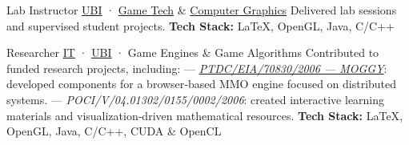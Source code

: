 \documentclass[
	a4paper,
]{fortysecondscv}
\begin{document}
\begin{cvtable}[3]
        {Lab Instructor}
        {\textcolor{cvsectioncolor}{\href{https://www.ubi.pt/}{UBI}} · \textcolor{cvsectioncolor}{\href{https://www.di.ubi.pt/~agomes/tjv/}{Game Tech}} \& 
        \textcolor{cvsectioncolor}{\href{https://www.di.ubi.pt/~agomes/cg/}{Computer Graphics}}
        }
        {Delivered lab sessions and supervised student projects.
         \newline \textbf{Tech Stack:} 
         {\color{sklimegreen}LaTeX},
         {\color{skyellow}OpenGL},
         {\color{skyellow}Java},   
         {\color{skorange}C/C++}}

        {Researcher}
        {\textcolor{cvsectioncolor}{\href{https://www.it.pt/}{IT}} · 
        \textcolor{cvsectioncolor}{\href{https://www.ubi.pt/}{UBI}} · Game Engines \& Game Algorithms}
        {Contributed to funded research projects, including:
         \newline — \textcolor{cvsectioncolor}{\textit{\href{https://www.it.pt/Projects/Index/804}{PTDC/EIA/70830/2006 — MOGGY}}}: developed components for a browser‑based MMO engine focused on distributed systems.
         \newline — \textit{POCI/V/04.01302/0155/0002/2006}: created interactive learning materials and visualization‑driven mathematical resources.
         \newline \textbf{Tech Stack:}
         {\color{sklimegreen}LaTeX},         
         {\color{skyellow}OpenGL},
         {\color{skyellow}Java}, 
         {\color{skorange}C/C++},         
         {\color{skorange}CUDA \& OpenCL}}
    
\end{cvtable}

\newpage
\makebacksidebar
\end{document}
